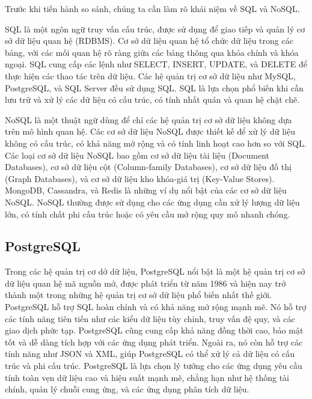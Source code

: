 Trước khi tiến hành so sánh, chúng ta cần làm rõ khái niệm về SQL và NoSQL.

SQL là một ngôn ngữ truy vấn cấu trúc, được sử dụng để giao tiếp và quản lý cơ sở dữ liệu quan hệ (RDBMS). Cơ sở dữ liệu quan hệ tổ chức dữ liệu trong các bảng, với các mối quan hệ rõ ràng giữa các bảng thông qua khóa chính và khóa ngoại. SQL cung cấp các lệnh như SELECT, INSERT, UPDATE, và DELETE để thực hiện các thao tác trên dữ liệu. Các hệ quản trị cơ sở dữ liệu như MySQL, PostgreSQL, và SQL Server đều sử dụng SQL. SQL là lựa chọn phổ biến khi cần lưu trữ và xử lý các dữ liệu có cấu trúc, có tính nhất quán và quan hệ chặt chẽ.

NoSQL là một thuật ngữ dùng để chỉ các hệ quản trị cơ sở dữ liệu không dựa trên mô hình quan hệ. Các cơ sở dữ liệu NoSQL được thiết kế để xử lý dữ liệu không có cấu trúc, có khả năng mở rộng và có tính linh hoạt cao hơn so với SQL. Các loại cơ sở dữ liệu NoSQL bao gồm cơ sở dữ liệu tài liệu (Document Databases), cơ sở dữ liệu cột (Column-family Databases), cơ sở dữ liệu đồ thị (Graph Databases), và cơ sở dữ liệu kho khóa-giá trị (Key-Value Stores). MongoDB, Cassandra, và Redis là những ví dụ nổi bật của các cơ sở dữ liệu NoSQL. NoSQL thường được sử dụng cho các ứng dụng cần xử lý lượng dữ liệu lớn, có tính chất phi cấu trúc hoặc có yêu cầu mở rộng quy mô nhanh chóng.

\subsection{PostgreSQL}
\indent Trong các hệ quản trị cơ dở dữ liệu, PostgreSQL nổi bật là một hệ quản trị cơ sở dữ liệu quan hệ mã nguồn mở, được phát triển từ năm 1986 và hiện nay trở thành một trong những hệ quản trị cơ sở dữ liệu phổ biến nhất thế giới. PostgreSQL hỗ trợ SQL hoàn chỉnh và có khả năng mở rộng mạnh mẽ. Nó hỗ trợ các tính năng tiên tiến như các kiểu dữ liệu tùy chỉnh, truy vấn đệ quy, và các giao dịch phức tạp. PostgreSQL cũng cung cấp khả năng đồng thời cao, bảo mật tốt và dễ dàng tích hợp với các ứng dụng phát triển. Ngoài ra, nó còn hỗ trợ các tính năng như JSON và XML, giúp PostgreSQL có thể xử lý cả dữ liệu có cấu trúc và phi cấu trúc. PostgreSQL là lựa chọn lý tưởng cho các ứng dụng yêu cầu tính toàn vẹn dữ liệu cao và hiệu suất mạnh mẽ, chẳng hạn như hệ thống tài chính, quản lý chuỗi cung ứng, và các ứng dụng phân tích dữ liệu.

